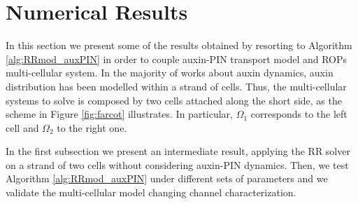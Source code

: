 \section{Numerical Results}
In this section we present some of the results obtained by resorting to Algorithm \ref{alg:RRmod_auxPIN} in order to couple auxin-PIN transport model and ROPs multi-cellular system. In the majority of works about auxin dynamics, auxin distribution has been modelled within a strand of cells. Thus, the multi-cellular systems to solve is composed by two cells attached along the short side, as the scheme in Figure \ref{fig:farcot} illustrates. In particular, $\Omega_1$ corresponds to the left cell and $\Omega_2$ to the right one.

In the first subsection we present an intermediate result, applying the RR solver on a strand of two cells without considering auxin-PIN dynamics. Then, we test Algorithm \ref{alg:RRmod_auxPIN} under different sets of parameters and we validate the multi-cellular model changing channel characterization.

%

